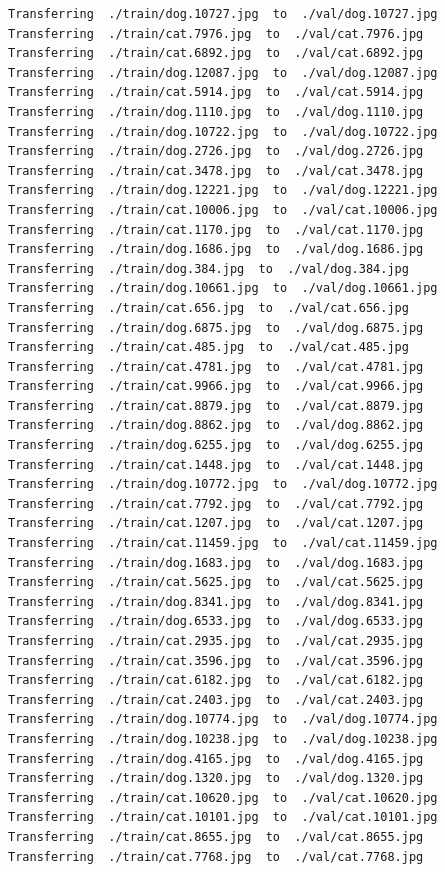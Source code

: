 \documentclass[]{book}
\theoremstyle{definition}
\theoremstyle{definition}
\theoremstyle{definition}
\theoremstyle{remark}
\begin{document}
\begin{verbatim}
Transferring  ./train/dog.10727.jpg  to  ./val/dog.10727.jpg
Transferring  ./train/cat.7976.jpg  to  ./val/cat.7976.jpg
Transferring  ./train/cat.6892.jpg  to  ./val/cat.6892.jpg
Transferring  ./train/dog.12087.jpg  to  ./val/dog.12087.jpg
Transferring  ./train/cat.5914.jpg  to  ./val/cat.5914.jpg
Transferring  ./train/dog.1110.jpg  to  ./val/dog.1110.jpg
Transferring  ./train/dog.10722.jpg  to  ./val/dog.10722.jpg
Transferring  ./train/dog.2726.jpg  to  ./val/dog.2726.jpg
Transferring  ./train/cat.3478.jpg  to  ./val/cat.3478.jpg
Transferring  ./train/dog.12221.jpg  to  ./val/dog.12221.jpg
Transferring  ./train/cat.10006.jpg  to  ./val/cat.10006.jpg
Transferring  ./train/cat.1170.jpg  to  ./val/cat.1170.jpg
Transferring  ./train/dog.1686.jpg  to  ./val/dog.1686.jpg
Transferring  ./train/dog.384.jpg  to  ./val/dog.384.jpg
Transferring  ./train/dog.10661.jpg  to  ./val/dog.10661.jpg
Transferring  ./train/cat.656.jpg  to  ./val/cat.656.jpg
Transferring  ./train/dog.6875.jpg  to  ./val/dog.6875.jpg
Transferring  ./train/cat.485.jpg  to  ./val/cat.485.jpg
Transferring  ./train/cat.4781.jpg  to  ./val/cat.4781.jpg
Transferring  ./train/cat.9966.jpg  to  ./val/cat.9966.jpg
Transferring  ./train/cat.8879.jpg  to  ./val/cat.8879.jpg
Transferring  ./train/dog.8862.jpg  to  ./val/dog.8862.jpg
Transferring  ./train/dog.6255.jpg  to  ./val/dog.6255.jpg
Transferring  ./train/cat.1448.jpg  to  ./val/cat.1448.jpg
Transferring  ./train/dog.10772.jpg  to  ./val/dog.10772.jpg
Transferring  ./train/cat.7792.jpg  to  ./val/cat.7792.jpg
Transferring  ./train/cat.1207.jpg  to  ./val/cat.1207.jpg
Transferring  ./train/cat.11459.jpg  to  ./val/cat.11459.jpg
Transferring  ./train/dog.1683.jpg  to  ./val/dog.1683.jpg
Transferring  ./train/cat.5625.jpg  to  ./val/cat.5625.jpg
Transferring  ./train/dog.8341.jpg  to  ./val/dog.8341.jpg
Transferring  ./train/dog.6533.jpg  to  ./val/dog.6533.jpg
Transferring  ./train/cat.2935.jpg  to  ./val/cat.2935.jpg
Transferring  ./train/cat.3596.jpg  to  ./val/cat.3596.jpg
Transferring  ./train/cat.6182.jpg  to  ./val/cat.6182.jpg
Transferring  ./train/cat.2403.jpg  to  ./val/cat.2403.jpg
Transferring  ./train/dog.10774.jpg  to  ./val/dog.10774.jpg
Transferring  ./train/dog.10238.jpg  to  ./val/dog.10238.jpg
Transferring  ./train/dog.4165.jpg  to  ./val/dog.4165.jpg
Transferring  ./train/dog.1320.jpg  to  ./val/dog.1320.jpg
Transferring  ./train/cat.10620.jpg  to  ./val/cat.10620.jpg
Transferring  ./train/cat.10101.jpg  to  ./val/cat.10101.jpg
Transferring  ./train/cat.8655.jpg  to  ./val/cat.8655.jpg
Transferring  ./train/cat.7768.jpg  to  ./val/cat.7768.jpg

\end{verbatim}
\end{document}
